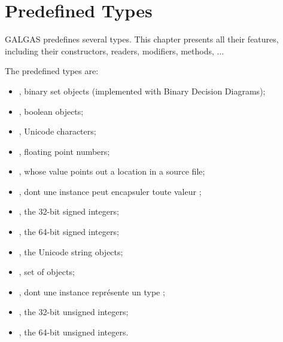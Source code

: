 
\chapter{Predefined Types} \label{predefinedTypes}

GALGAS predefines several types. This chapter presents all their features, including their constructors, readers, modifiers, methods, ...


\begin{description}
\item The predefined types are:
\begin{itemize}
\item {}, binary set objects (implemented with Binary Decision Diagrams);
\item {}, boolean objects;
\item {}, Unicode characters;
\item {}, floating point numbers;
\item {}, whose value points out a location in a source file;
\item {}, dont une instance peut encapsuler toute valeur ;
\item {}, the 32-bit signed integers;
\item {}, the 64-bit signed integers;
\item {}, the Unicode string objects;
\item {}, set of  objects;
\item {}, dont une instance représente un type ;
\item {}, the 32-bit unsigned integers;
\item {}, the 64-bit unsigned integers.
\end{itemize}
\end{description}

